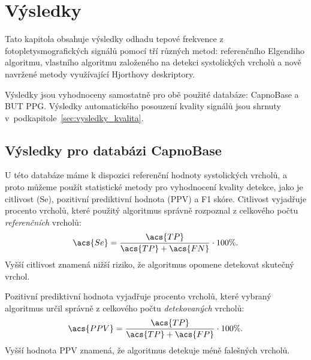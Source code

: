 \chapter{Výsledky} %
\label{ch:vysledky}
Tato kapitola obsahuje výsledky odhadu tepové frekvence z fotopletysmografických signálů pomocí tří různých metod:
referenčního Elgendiho algoritmu, vlastního algoritmu založeného na detekci systolických vrcholů a nově navržené metody využívající Hjorthovy deskriptory.

Výsledky jsou vyhodnoceny samostatně pro obě použité databáze: CapnoBase a \acl{BUT PPG}.
Výsledky automatického posouzení kvality signálů jsou shrnuty v~podkapitole~\ref{sec:vysledky_kvalita}.

\section{Výsledky pro databázi CapnoBase}
\label{sec:vysledky_capnobase}
U této databáze máme k dispozici referenční hodnoty systolických vrcholů, a proto můžeme použít statistické metody pro vyhodnocení kvality detekce, jako je citlivost (\acs{Se}), pozitivní prediktivní hodnota (\acs{PPV}) a F1 skóre.
Citlivost vyjadřuje procento vrcholů, které použitý algoritmus správně rozpoznal z celkového počtu \textit{referenčních} vrcholů:
\begin{equation}
	\label{eq:se}
	\acs{Se} = \frac{\acs{TP}}{\acs{TP} + \acs{FN}} \cdot 100\%.
\end{equation}
Vyšší citlivost znamená nižší riziko, že algoritmus opomene detekovat skutečný vrchol.

Pozitivní prediktivní hodnota vyjadřuje procento vrcholů, které vybraný algoritmus určil správně z celkového počtu \textit{detekovaných} vrcholů:
\begin{equation}
	\label{eq:ppv}
	\acs{PPV} = \frac{\acs{TP}}{\acs{TP} + \acs{FP}} \cdot 100\%.
\end{equation}
Vyšší hodnota \acs{PPV} znamená, že algoritmus detekuje méně falešných vrcholů.

